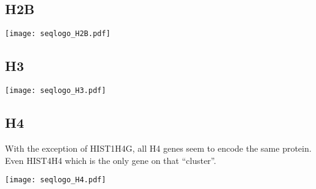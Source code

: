 
  \subsection{H2B}
    \begin{TableAndFigure*}
      \label{tab:H2B-consensus}
      

      \texttt{[image: seqlogo\_H2B.pdf]}
      \label{fig:H2B-weblogo}
    \end{TableAndFigure*}

  \subsection{H3}
    \begin{TableAndFigure*}
      \label{tab:H3-consensus}
      

      \texttt{[image: seqlogo\_H3.pdf]}
      \label{fig:H3-weblogo}
    \end{TableAndFigure*}

  \subsection{H4}
    With the exception of HIST1H4G, all H4 genes seem to encode the same protein. Even HIST4H4 which is the
    only gene on that ``cluster''.
    \begin{TableAndFigure*}
      \label{tab:H4-consensus}
      

      \texttt{[image: seqlogo\_H4.pdf]}
      \label{fig:H4-weblogo}
    \end{TableAndFigure*}

